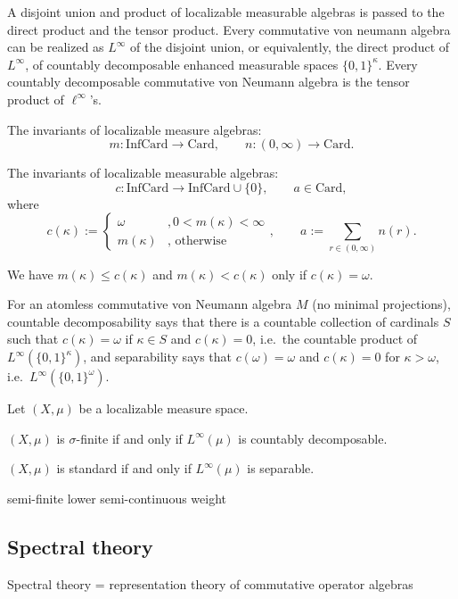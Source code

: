 \documentclass{../../large}
\begin{document}
A disjoint union and product of localizable measurable algebras is passed to the direct product and the tensor product.
Every commutative von neumann algebra can be realized as $L^\infty$ of the disjoint union, or equivalently, the direct product of $L^\infty$, of countably decomposable enhanced measurable spaces $\{0,1\}^\kappa$.
Every countably decomposable commutative von Neumann algebra is the tensor product of $\ell^\infty$'s.

The invariants of localizable measure algebras:
\[m:\mathrm{InfCard}\to\mathrm{Card},\qquad n:(0,\infty)\to\mathrm{Card}.\]

The invariants of localizable measurable algebras:
\[c:\mathrm{InfCard}\to\mathrm{InfCard}\cup\{0\},\qquad a\in\mathrm{Card},\]
where
\[c(\kappa):=\begin{cases}\omega&,0<m(\kappa)<\infty\\m(\kappa)&,\text{ otherwise}\end{cases},\qquad a:=\sum_{r\in(0,\infty)}n(r).\]

We have $m(\kappa)\le c(\kappa)$ and $m(\kappa)<c(\kappa)$ only if $c(\kappa)=\omega$.

For an atomless commutative von Neumann algebra $M$ (no minimal projections), countable decomposability says that there is a countable collection of cardinals $S$ such that $c(\kappa)=\omega$ if $\kappa\in S$ and $c(\kappa)=0$, i.e.~the countable product of $L^\infty(\{0,1\}^\kappa)$, and separability says that $c(\omega)=\omega$ and $c(\kappa)=0$ for $\kappa>\omega$, i.e.~$L^\infty(\{0,1\}^\omega)$.



\begin{prb}
Let $(X,\mu)$ be a localizable measure space.
\begin{parts}
\item $(X,\mu)$ is $\sigma$-finite if and only if $L^\infty(\mu)$ is countably decomposable.
\item $(X,\mu)$ is standard if and only if $L^\infty(\mu)$ is separable.
\end{parts}
\end{prb}


\begin{prb}
semi-finite lower semi-continuous weight
\end{prb}







\subsection{Spectral theory}
Spectral theory = representation theory of commutative operator algebras
\end{document}

